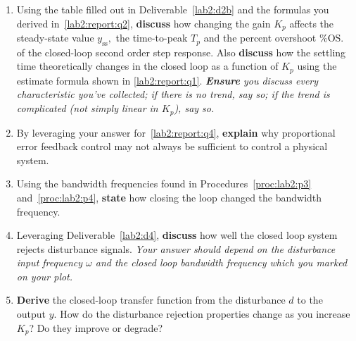 \begin{deliverable}[label={lab2:report}]
\begin{enumerate}[label={(\arabic*)}]
    \item{
      Using the table filled out in Deliverable~\ref{lab2:d2b} and the
      formulas you derived in~\ref{lab2:report:q2},
      \textbf{discuss} how changing the
      gain \(K_p\) affects the steady-state value \(y_\mathrm{ss},\) the
      time-to-peak \(T_p\) and the percent overshoot \(\%\mathrm{OS}.\)
      of the closed-loop second order step response.
      Also \textbf{discuss} how the settling time theoretically changes in the
      closed loop as a function of \(K_p\) using the estimate formula shown in
      \ref{lab2:report:q1}.
      \emph{\textbf{Ensure} you discuss every characteristic
      you've collected; if there is no trend, say so; if the trend is
      complicated (not simply linear in \(K_p\)), say so.}
      \label{lab2:report:q4}
    }
    \item{
      By leveraging your answer for~\ref{lab2:report:q4}, \textbf{explain} why
      proportional error feedback control may not always be sufficient to
      control a physical system.
      \label{lab2:report:q4b}
    }
    \item{
      Using the bandwidth frequencies found in Procedures~\ref{proc:lab2:p3}
      and~\ref{proc:lab2:p4}, \textbf{state} how closing the loop
      changed the bandwidth frequency.
      \label{lab2:report:q5}
    }
    \item{
      Leveraging Deliverable~\ref{lab2:d4}, \textbf{discuss} how well the
      closed loop system rejects disturbance signals.
      \emph{Your answer should depend on the disturbance input frequency
      \(\omega\) and the closed loop bandwidth frequency which you marked
      on your plot.}
      \label{lab2:report:q6}
    }
    \item{
      \textbf{Derive} the closed-loop transfer function from the
      disturbance \(d\) to the output \(y.\) How do the disturbance rejection
      properties change as you increase \(K_p\)? Do they improve or degrade?
}
\end{enumerate}
\end{deliverable}
